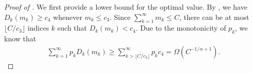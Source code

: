 \documentclass[11pt]{article}
\theoremstyle{plain}
\theoremstyle{definition}
\newcommand{\capacity}{C}
\newcommand{\testmodelerror}{\mathsf{Red}_M}
\begin{document}
\begin{proof}[Proof of ]
We first provide a lower bound for the optimal value.
By , we have \( D_k(m_k) \ge c_4 \) whenever \( m_k \le c_3 \).
Since \( \sum\limits_{k=1}^{\infty} m_k \le C \), there can be at most \( \lfloor C / c_3 \rfloor \) indices \( k \) such that \( D_k(m_k) < c_4 \).
Due to the monotonicity of $p_k$, we know that 
\begin{align}
    \sum\limits_{k=1}^{\infty}p_kD_k(m_k)\ge \sum\limits_{k>\lfloor C / c_3 \rfloor}^{\infty}p_kc_4=\Omega(C^{-1/\alpha+1}).
    \label{eq:model scaling Omega}
\end{align}






\end{proof}
\end{document}
